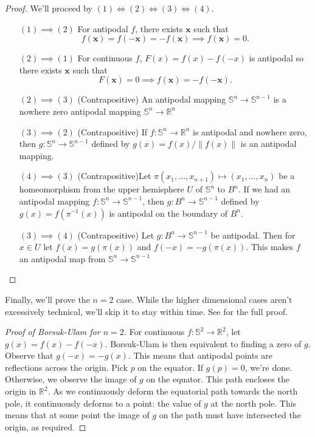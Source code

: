 \documentclass[12pt]{amsart}
\theoremstyle{definition}
\begin{document}
    \begin{proof} We'll proceed by $(1) \iff (2) \iff (3) \iff (4)$.

        \begin{enumerate}
            \item[$(1) \implies (2)$] For antipodal $f$, there exists $\mathbf x$ such that $$f(\mathbf x) = f(-\mathbf x) = -f(\mathbf x) \implies f(\mathbf x) = 0.$$
            \item[$(2) \implies (1)$] For continuous $f$, $F(x) = f(x) - f(-x)$ is antipodal so there exists $\mathbf x$ such that $$F(\mathbf x) = 0 \implies f(\mathbf x) = -f(-\mathbf x).$$
            \item[$(2) \implies (3)$] (Contrapositive) An antipodal mapping $\mathbb S^n \to \mathbb S^{n-1}$ is a nowhere zero antipodal mapping $\mathbb S^n \to \mathbb R^n$
            \item[$(3) \implies (2)$] (Contrapositive) If $f: \mathbb S^n \to \mathbb R^n$ is antipodal and nowhere zero, then $g: \mathbb S^n \to \mathbb S^{n-1}$ defined by $g(x) = f(x) / \|f(x)\|$ is an antipodal mapping.
            \item[$(4) \implies (3)$] (Contrapositive)Let $\pi (x_1, \dots, x_{n+1}) \mapsto (x_1, \dots, x_n)$ be a homeomorphism from the upper hemisphere $U$ of $\mathbb S^n$ to $B^n$. If we had an antipodal mapping $f: \mathbb S^n \to \mathbb S^{n-1}$, then $g: B^n \to \mathbb S^{n-1}$ defined by $g(x) = f(\pi^{-1}(x))$ is antipodal on the boundary of $B^n$.
            \item[$(3) \implies (4)$] (Contrapositive) Let $g: B^n \to \mathbb S^{n-1}$ be antipodal. Then for $x \in U$ let $f(x) = g(\pi(x))$ and $f(-x) = -g(\pi(x))$. This makes $f$ an antipodal map from $\mathbb S^n \to \mathbb S^{n-1}$
        \end{enumerate}
    \end{proof}

    Finally, we'll prove the $n=2$ case. While the higher dimensional cases aren't excessively technical, we'll skip it to stay within time. See \cite[ch 2]{topcombi} for the full proof.

    \begin{proof}[Proof of Borsuk-Ulam for $n=2$]
        For continuous $f: \mathbb S^2 \to \mathbb R^2$, let $g(x) = f(x) - f(-x)$. Borsuk-Ulam is then equivalent to finding a zero of $g$. Observe that $g(-x) = -g(x)$. This means that antipodal points are reflections across the origin. Pick $p$ on the equator. If $g(p) = 0$, we're done. Otherwise, we observe the image of $g$ on the equator. This path encloses the origin in $\mathbb R^2$. As we continuously deform the equatorial path towards the north pole, it continuously deforms to a point: the value of $g$ at the north pole. This means that at some point the image of $g$ on the path must have intersected the origin, as required.
    \end{proof}
\end{document}
